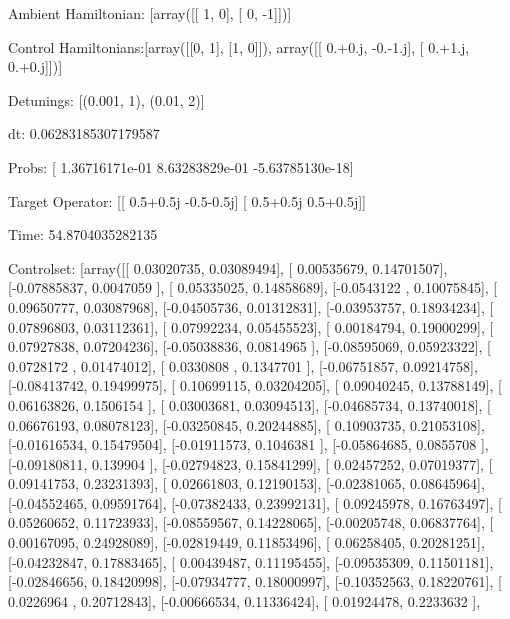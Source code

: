 \documentclass{article}
\begin{document}
    

\newpage

Ambient Hamiltonian: [array([[ 1,  0],
       [ 0, -1]])]

Control Hamiltonians:[array([[0, 1],
       [1, 0]]), array([[ 0.+0.j, -0.-1.j],
       [ 0.+1.j,  0.+0.j]])]

Detunings: [(0.001, 1), (0.01, 2)]

 dt: 0.06283185307179587

Probs: [  1.36716171e-01   8.63283829e-01  -5.63785130e-18]

Target Operator: [[ 0.5+0.5j -0.5-0.5j]
 [ 0.5+0.5j  0.5+0.5j]]

Time: 54.8704035282135

Controlset: [array([[ 0.03020735,  0.03089494],
       [ 0.00535679,  0.14701507],
       [-0.07885837,  0.0047059 ],
       [ 0.05335025,  0.14858689],
       [-0.0543122 ,  0.10075845],
       [ 0.09650777,  0.03087968],
       [-0.04505736,  0.01312831],
       [-0.03953757,  0.18934234],
       [ 0.07896803,  0.03112361],
       [ 0.07992234,  0.05455523],
       [ 0.00184794,  0.19000299],
       [ 0.07927838,  0.07204236],
       [-0.05038836,  0.0814965 ],
       [-0.08595069,  0.05923322],
       [ 0.0728172 ,  0.01474012],
       [ 0.0330808 ,  0.1347701 ],
       [-0.06751857,  0.09214758],
       [-0.08413742,  0.19499975],
       [ 0.10699115,  0.03204205],
       [ 0.09040245,  0.13788149],
       [ 0.06163826,  0.1506154 ],
       [ 0.03003681,  0.03094513],
       [-0.04685734,  0.13740018],
       [ 0.06676193,  0.08078123],
       [-0.03250845,  0.20244885],
       [ 0.10903735,  0.21053108],
       [-0.01616534,  0.15479504],
       [-0.01911573,  0.1046381 ],
       [-0.05864685,  0.0855708 ],
       [-0.09180811,  0.139904  ],
       [-0.02794823,  0.15841299],
       [ 0.02457252,  0.07019377],
       [ 0.09141753,  0.23231393],
       [ 0.02661803,  0.12190153],
       [-0.02381065,  0.08645964],
       [-0.04552465,  0.09591764],
       [-0.07382433,  0.23992131],
       [ 0.09245978,  0.16763497],
       [ 0.05260652,  0.11723933],
       [-0.08559567,  0.14228065],
       [-0.00205748,  0.06837764],
       [ 0.00167095,  0.24928089],
       [-0.02819449,  0.11853496],
       [ 0.06258405,  0.20281251],
       [-0.04232847,  0.17883465],
       [ 0.00439487,  0.11195455],
       [-0.09535309,  0.11501181],
       [-0.02846656,  0.18420998],
       [-0.07934777,  0.18000997],
       [-0.10352563,  0.18220761],
       [ 0.0226964 ,  0.20712843],
       [-0.00666534,  0.11336424],
       [ 0.01924478,  0.2233632 ],
\end{document}
